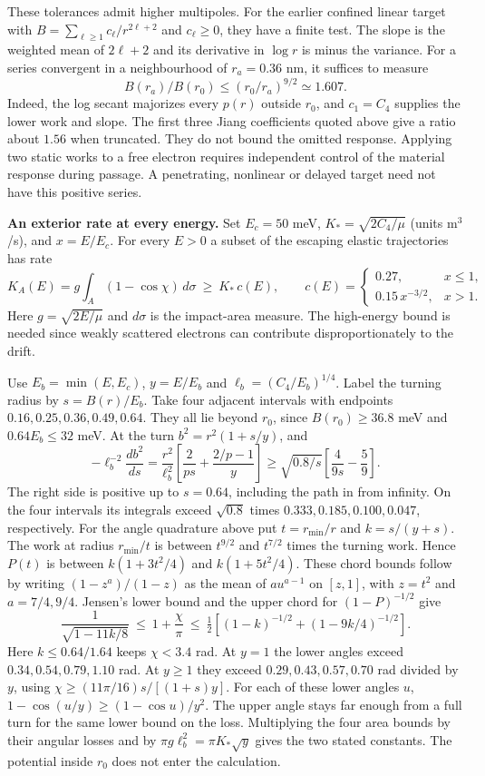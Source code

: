 \documentclass[11pt,a4paper]{article}
\begin{document}
These tolerances admit higher multipoles. For the earlier confined
linear target with \(B=\sum_{\ell\ge1}c_\ell/r^{2\ell+2}\) and
\(c_\ell\ge0\), they have a finite test. The slope is the weighted mean
of \(2\ell+2\) and its derivative in \(\log r\) is minus the variance.
For a series convergent in a neighbourhood of \(r_a=0.36\) nm, it
suffices to measure \[
 B(r_a)/B(r_0)\le(r_0/r_a)^{9/2}\simeq1.607 .
\] Indeed, the log secant majorizes every \(p(r)\) outside \(r_0\), and
\(c_1=C_4\) supplies the lower work and slope. The first three Jiang
coefficients quoted above give a ratio about \(1.56\) when truncated.
They do not bound the omitted response. Applying two static works to a
free electron requires independent control of the material response
during passage. A penetrating, nonlinear or delayed target need not have
this positive series.

\textbf{An exterior rate at every energy.} Set \(E_c=50\) meV,
\(K_*=\sqrt{2C_4/\mu}\) (units m\(^3\)/s), and \(x=E/E_c\). For every
\(E>0\) a subset of the escaping elastic trajectories has rate \[
 K_A(E)=g\int_A(1-\cos\chi)\,d\sigma \ \ge\ K_*\,c(E),\qquad
 c(E)=\begin{cases}0.27,& x\le1,\\0.15\,x^{-3/2},&x>1.\end{cases}
\] Here \(g=\sqrt{2E/\mu}\) and \(d\sigma\) is the impact-area measure.
The high-energy bound is needed since weakly scattered electrons can
contribute disproportionately to the drift.

Use \(E_b=\min(E,E_c)\), \(y=E/E_b\) and \(\ell_b=(C_4/E_b)^{1/4}\).
Label the turning radius by \(s=B(r)/E_b\). Take four adjacent intervals
with endpoints \(0.16,0.25,0.36,0.49,0.64\). They all lie beyond
\(r_0\), since \(B(r_0)\ge36.8\) meV and \(0.64E_b\le32\) meV. At the
turn \(b^2=r^2(1+s/y)\), and \[
 -\ell_b^{-2}\frac{db^2}{ds}
 =\frac{r^2}{\ell_b^2}
 \left[\frac{2}{p s}+\frac{2/p-1}{y}\right]
 \ge\sqrt{0.8/s}\left[\frac{4}{9s}-\frac59\right].
\] The right side is positive up to \(s=0.64\), including the path in
from infinity. On the four intervals its integrals exceed \(\sqrt{0.8}\)
times \(0.333,0.185,0.100,0.047\), respectively. For the angle
quadrature above put \(t=r_{\min}/r\) and \(k=s/(y+s)\). The work at
radius \(r_{\min}/t\) is between \(t^{9/2}\) and \(t^{7/2}\) times the
turning work. Hence \(P(t)\) is between \(k(1+3t^2/4)\) and
\(k(1+5t^2/4)\). These chord bounds follow by writing \((1-z^a)/(1-z)\)
as the mean of \(a u^{a-1}\) on \([z,1]\), with \(z=t^2\) and
\(a=7/4,9/4\). Jensen's lower bound and the upper chord for
\((1-P)^{-1/2}\) give \[
 \frac{1}{\sqrt{1-11k/8}}
 \ \le\ 1+\frac{\chi}{\pi}
 \ \le\ \tfrac12\left[(1-k)^{-1/2}+(1-9k/4)^{-1/2}\right].
\] Here \(k\le0.64/1.64\) keeps \(\chi<3.4\) rad. At \(y=1\) the lower
angles exceed \(0.34,0.54,0.79,1.10\) rad. At \(y\ge1\) they exceed
\(0.29,0.43,0.57,0.70\) rad divided by \(y\), using
\(\chi\ge(11\pi/16)s/[(1+s)y]\). For each of these lower angles \(u\),
\(1-\cos(u/y)\ge(1-\cos u)/y^2\). The upper angle stays far enough from
a full turn for the same lower bound on the loss. Multiplying the four
area bounds by their angular losses and by
\(\pi g\ell_b^2=\pi K_*\sqrt y\) gives the two stated constants. The
potential inside \(r_0\) does not enter the calculation.
\end{document}

